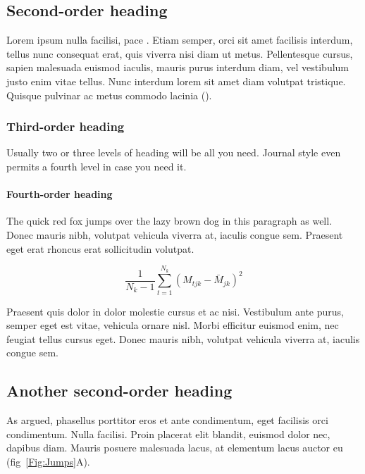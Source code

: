 \documentclass[11pt]{article}
\begin{document}
	\subsection*{Second-order heading}
	
	Lorem ipsum nulla facilisi, pace \citet{LemKapEx07}. Etiam semper, orci sit amet facilisis interdum, tellus nunc consequat erat, quis viverra nisi diam ut metus. Pellentesque cursus, sapien malesuada euismod iaculis, mauris purus interdum diam, vel vestibulum justo enim vitae tellus. Nunc interdum lorem sit amet diam volutpat tristique. Quisque pulvinar ac metus commodo lacinia (\citealt{Ing11,Xiao2015}).  
	
	\subsubsection*{Third-order heading}
	
	Usually two or three levels of heading will be all you need. Journal style even permits a fourth level in case you need it.
	
	\paragraph*{Fourth-order heading}
	The quick red fox jumps over the lazy brown dog in this paragraph as well. Donec mauris nibh, volutpat vehicula viverra at, iaculis congue sem. Praesent eget erat rhoncus erat sollicitudin volutpat. 
	
	\begin{equation}
	{ \frac{1}{N_k-1} \sum \limits_{t=1}^{N_k} (M_{tjk} - \bar{M}_{jk})^2}
	\end{equation}
	
	Praesent quis dolor in dolor molestie cursus et ac nisi. Vestibulum ante purus, semper eget est vitae, vehicula ornare nisl. Morbi efficitur euismod enim, nec feugiat tellus cursus eget. Donec mauris nibh, volutpat vehicula viverra at, iaculis congue sem.
	
	\subsection*{Another second-order heading}
	
	As \citet{Xiao2015} argued, phasellus porttitor eros et ante condimentum, eget facilisis orci condimentum. Nulla facilisi. Proin placerat elit blandit, euismod dolor nec, dapibus diam. Mauris posuere malesuada lacus, at elementum lacus auctor eu (fig~\ref{Fig:Jumps}A). 
	
\end{document}

